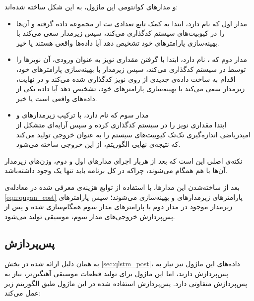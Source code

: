 و مدارهای کوانتومی این ماژول، به این شکل ساخته شده‌اند:
\begin{itemize}
    \item
    مدار اول که
    نام دارد،
    ابتدا به کمک تابع
    تعدادی نت از مجموعه داده گرفته و آن‌ها را در کیوبیت‌های سیستم کدگذاری می‌کند، سپس زیرمدار
    سعی می‌کند با بهینه‌سازی پارامترهای خود تشخیص دهد آیا داده‌ها واقعی هستند یا خیر.
    
    \item
    مدار دوم که
    ،
    نام دارد، ابتدا با گرفتن مقداری نویز به عنوان ورودی، آن نویزها را توسط
    در سیستم کدگذاری می‌کند، سپس زیرمدار
    با بهینه‌سازی پارامترهای خود، اقدام به ساخت داده‌ی جدیدی از روی نویز کدگذاری شده می‌کند و در نهایت، زیرمدار
    سعی می‌کند با بهینه‌سازی پارامترهای خود، تشخیص دهد آیا داده یکی از داده‌های واقعی است یا خیر.
    
    \item
    مدار سوم که
    نام دارد، با ترکیب زیرمدار‌های
    و \\
    ابتدا مقداری نویز را در سیستم کدگذاری کرده و سپس آرایه‌ای متشکل از امیدریاضی اندازه‌گیری تک‌تک کیوبیت‌های سیستم را به عنوان خروجی تولید می‌کند که نتیجه‌ی نهایی الگوریتم، از این خروجی ساخته می‌شود.
    
\end{itemize}
نکته‌ی اصلی این است که بعد از هربار اجرای مدارهای اول و دوم، وزن‌های زیرمدار
آن‌ها با هم همگام می‌شوند، چراکه در کل برنامه باید تنها یک
وجود داشته‌باشد.

بعد از ساخته‌شدن این مدارها، با استفاده از توابع هزینه‌ی معرفی شده در معادله‌ی
\ref{eqn:qugan_cost}
پارامترهای زیرمدارهای 
و
بهینه‌سازی می‌شوند؛ سپس پارامترهای زیرمدار
موجود در مدار دوم با پارامترهای مدار سوم همگام‌سازی شده و پس از پس‌پردازش خروجی‌های مدار سوم، موسیقی تولید می‌شود.

\subsection{پس‌پردازش}
به همان دلیل ارائه شده در بخش
\ref{sec:qlstm_post}،
داده‌های این ماژول نیز نیاز به پس‌پردازش دارند، اما این ماژول برای تولید قطعات موسیقی آهنگین‌تر، نیاز به پس‌پردازش متفاوتی دارد.
پس‌پردازش استفاده شده در این ماژول طبق الگوریتم زیر عمل می‌کند:

